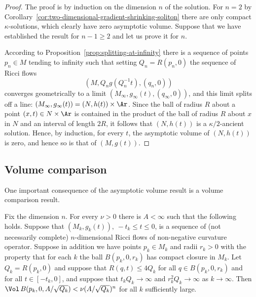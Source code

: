 \begin{proof}
The proof is by induction on the dimension $n$ of the solution. For $n=2$ by
Corollary~\ref{cor:two-dimensional-gradient-shrinking-soliton} there are only compact $\kappa$-solutions, which clearly
have zero asymptotic volume. Suppose that we have established the result for
$n-1\ge 2$ and let us prove it for $n$.

According to Proposition~\ref{prop:splitting-at-infinity} there is a sequence of points $p_n\in
M$ tending to infinity such that setting $Q_n=R(p_n,0)$ the sequence of Ricci
flows
$$(M,Q_ng(Q_n^{-1}t),(q_n,0))$$ converges geometrically to a limit
$(M_\infty,g_\infty(t),(q_\infty,0))$, and this limit splits off a
line: $(M_\infty,g_\infty(t))= (N,h(t))\times \Ar$. Since the ball
of radius $R$ about a point $(x,t)\in N\times \Ar$ is contained in
the product of the ball of radius $R$ about $x$ in $N$ and an
interval of length $2R$, it follows that $(N,h(t))$ is a
$\kappa/2$-ancient solution. Hence, by induction, for every $t$, the
asymptotic volume of $(N,h(t))$ is zero, and hence so is that of
$(M,g(t))$.
\end{proof}



\subsection{Volume comparison}

One important consequence of the asymptotic volume result is a
volume comparison result.

\begin{proposition}\label{prop:volume-comparison-bound}
\label{volcomp}
Fix the dimension $n$.
For every $\nu>0$ there is $A<\infty$ such that the following holds.
Suppose that $(M_k,g_k(t)),\ -t_k\le t\le 0$, is a sequence of (not
necessarily complete) $n$-dimensional Ricci flows of non-negative
curvature operator. Suppose in addition we have points $p_k\in M_k$
and radii $r_k>0$ with the property that for each $k$ the ball
$B(p_k,0,r_k)$ has compact closure in $M_k$. Let $Q_k=R(p_k,0)$ and
suppose that $R(q,t)\le 4Q_k$ for all $q\in B(p_k,0,r_k)$ and for
all $t\in [-t_k,0]$, and suppose that $t_kQ_k\rightarrow\infty$ and
$r_k^2Q_k\rightarrow\infty$ as $k\rightarrow\infty$. Then $\Vol\,B(p_k,0,A/\sqrt{Q_k})< \nu(A/\sqrt{Q_k})^n$ for all $k$
sufficiently large.
\end{proposition}


